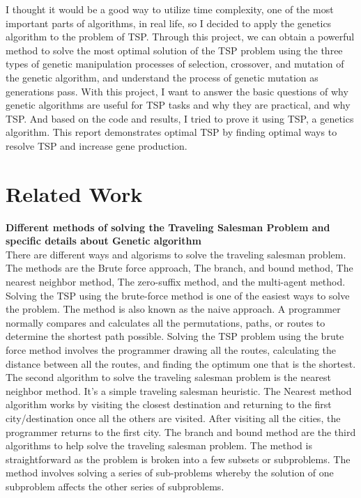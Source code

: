 \documentclass[12pt]{article}
\begin{document}
I thought it would be a good way to utilize time complexity, one of the most important parts of algorithms, in real life, so I decided to apply the genetics algorithm to the problem of TSP. Through this project, we can obtain a powerful method to solve the most optimal solution of the TSP problem using the three types of genetic manipulation processes of selection, crossover, and mutation of the genetic algorithm, and understand the process of genetic mutation as generations pass. With this project, I want to answer the basic questions of why genetic algorithms are useful for TSP tasks and why they are practical, and why TSP. And based on the code and results, I tried to prove it using TSP, a genetics algorithm. This report demonstrates optimal TSP by finding optimal ways to resolve TSP and increase gene production.

\section*{Related Work} 
\textbf{Different methods of solving the Traveling Salesman Problem and specific details about Genetic algorithm}\\

There are different ways and algorisms to solve the traveling salesman problem. The methods are the Brute force approach, The branch, and bound method, The nearest neighbor method, The zero-suffix method, and the multi-agent method. Solving the TSP using the brute-force method is one of the easiest ways to solve the problem\cite{helsgaun2000effective}. The method is also known as the naive approach. A programmer normally compares and calculates all the permutations, paths, or routes to determine the shortest path possible\cite{wise2018gis}. Solving the TSP problem using the brute force method involves the programmer drawing all the routes, calculating the distance between all the routes, and finding the optimum one that is the shortest\cite{wise2018gis}. \\

The second algorithm to solve the traveling salesman problem is the nearest neighbor method. It’s a simple traveling salesman heuristic. The Nearest method algorithm works by visiting the closest destination and returning to the first city/destination once all the others are visited\cite{henning2013graph}. After visiting all the cities, the programmer returns to the first city. The branch and bound method are the third algorithms to help solve the traveling salesman problem. The method is straightforward as the problem is broken into a few subsets or subproblems\cite{henning2013graph}. The method involves solving a series of sub-problems whereby the solution of one subproblem affects the other series of subproblems\cite{hong2006management}. \\
\end{document}
